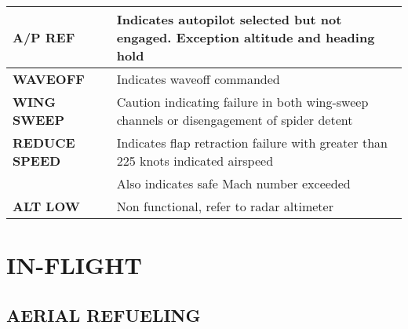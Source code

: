 \documentclass[fontMetropolis]{TechCheck}
\begin{document}
\begin{table}[h]
\begin{tabular}{p{2.8cm} | p{9cm}}
			\midrule
			\textbf{A/P REF} & Indicates autopilot selected but not engaged. Exception altitude and heading hold \\
			\midrule
			\textbf{WAVEOFF} & Indicates waveoff commanded \\
			\midrule
			\textbf{WING SWEEP} & Caution indicating failure in both wing-sweep channels or disengagement of spider detent \\
			\midrule
			\textbf{REDUCE SPEED} & Indicates flap retraction failure with greater than 225 knots indicated airspeed \\
			& Also indicates safe Mach number exceeded \\
			\midrule
			\textbf{ALT LOW} & Non functional, refer to radar altimeter \\
			\bottomrule
		\end{tabular}
	\end{table}

	\clearpage

	\section{IN-FLIGHT}
	\subsection{AERIAL REFUELING}
	\begin{tablenumerate}
	\end{tablenumerate}
\end{document}
